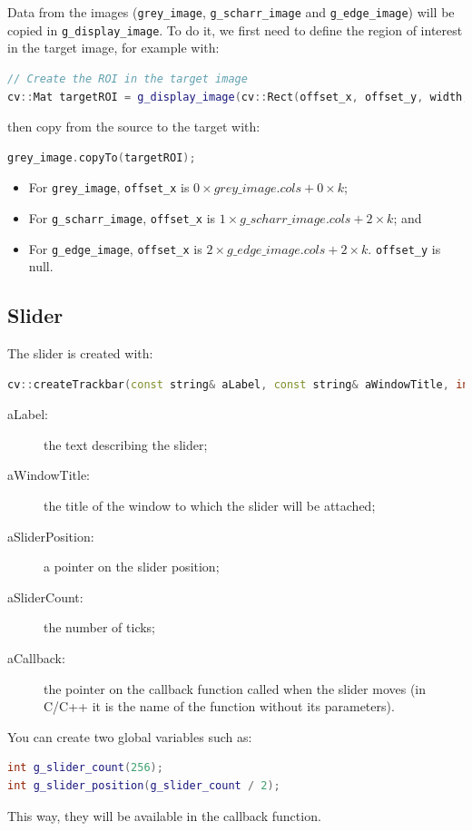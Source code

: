 \documentclass[english,a4paper,12pt,oneside]{article}
\begin{document}
Data from the images (\verb+grey_image+, \verb+g_scharr_image+ and \verb+g_edge_image+) will be copied in \verb+g_display_image+. 
To do it, we first need to define the region of interest in the target image, for example with:
 \begin{lstlisting}[language=c++]
// Create the ROI in the target image
cv::Mat targetROI = g_display_image(cv::Rect(offset_x, offset_y, width, height))
\end{lstlisting}
then copy from the source to the target with:
 \begin{lstlisting}[language=c++]
grey_image.copyTo(targetROI);
\end{lstlisting}
\begin{itemize}
 \item For \verb+grey_image+,     \verb+offset_x+ is $0 \times grey\_image.cols + 0 \times k$;
 \item For \verb+g_scharr_image+, \verb+offset_x+ is $1 \times g\_scharr\_image.cols + 2 \times k$; and
 \item For \verb+g_edge_image+,   \verb+offset_x+ is $2 \times g\_edge\_image.cols + 2 \times k$. 
\verb+offset_y+ is null.
\end{itemize}


\subsection{Slider}

The slider is created with:
 \begin{lstlisting}[language=c++]
        cv::createTrackbar(const string& aLabel, const string& aWindowTitle, int* aSliderPosition, int aSliderCount, void (*aCallback)(int, void*));
\end{lstlisting}
\begin{description}
 \item[aLabel:] the text describing the slider;
 \item[aWindowTitle:] the title of the window to which the slider will be attached;
 \item[aSliderPosition:] a pointer on the slider position;
 \item[aSliderCount:] the number of ticks;
 \item[aCallback:] the pointer on the callback function called when the slider moves (in C/C++ it is the name of the function without its parameters).
\end{description}

You can create two global variables such as:
\begin{lstlisting}[language=c++]
int g_slider_count(256);
int g_slider_position(g_slider_count / 2);
\end{lstlisting}
This way, they will be available in the callback function. 
 
\end{document}
